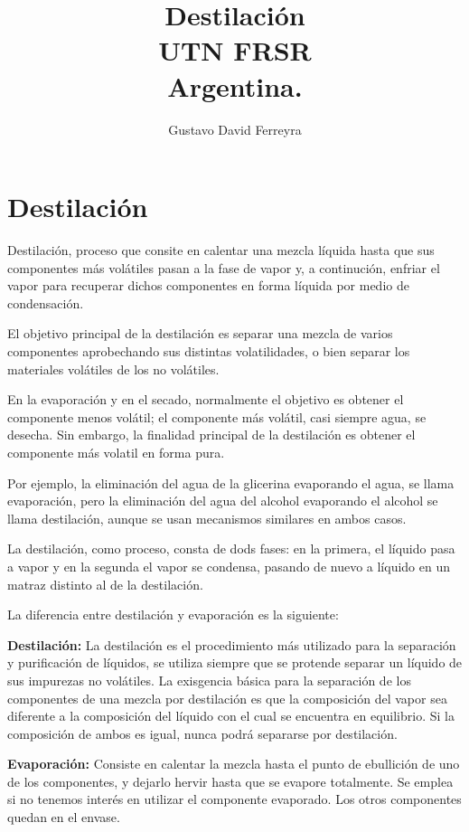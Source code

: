 \documentclass[10pt,twocolumn,openany]{book}
\title{Destilación \\ UTN FRSR \\ Argentina.}
\author{Gustavo David Ferreyra}
\begin{document}
\maketitle
\chapter{Destilación}

Destilación, proceso que consite en calentar una mezcla líquida hasta que sus componentes más 
volátiles pasan a la fase de vapor y, a continución, enfriar el vapor para recuperar dichos 
componentes en forma líquida por medio de condensación.

El objetivo principal de la destilación es separar una mezcla de varios componentes aprobechando 
sus distintas volatilidades, o bien separar los materiales volátiles de los no volátiles.

En la evaporación y en el secado, normalmente el objetivo es obtener el componente menos volátil;
el componente más volátil, casi siempre agua, se desecha. Sin embargo, la finalidad principal 
de la destilación es obtener el componente más volatil en forma pura.

Por ejemplo, la eliminación del agua de la glicerina evaporando el agua, se llama evaporación, pero 
la eliminación del agua del alcohol evaporando el alcohol se llama destilación, aunque se usan 
mecanismos similares en ambos casos.

La destilación, como proceso, consta de dods fases: en la primera, el líquido pasa a vapor y en la 
segunda el vapor se condensa, pasando de nuevo a líquido en un matraz distinto al de la destilación.

La diferencia entre destilación y evaporación es la siguiente:

\textbf{Destilación:} La destilación es el procedimiento más utilizado para la separación y purificación de 
líquidos, se utiliza siempre  que se protende separar un líquido de sus impurezas no volátiles.
La exisgencia básica para la separación de los componentes de una mezcla por destilación es que la 
composición del vapor sea diferente a la composición del líquido con el cual se encuentra en equilibrio. Si 
la composición de ambos es igual, nunca podrá separarse por destilación.

\textbf{Evaporación:} Consiste en calentar la mezcla hasta el punto de ebullición de uno de los 
componentes, y dejarlo hervir hasta que se evapore totalmente. Se emplea si no tenemos interés 
en utilizar el componente evaporado. Los otros componentes quedan en el envase.
\end{document}
